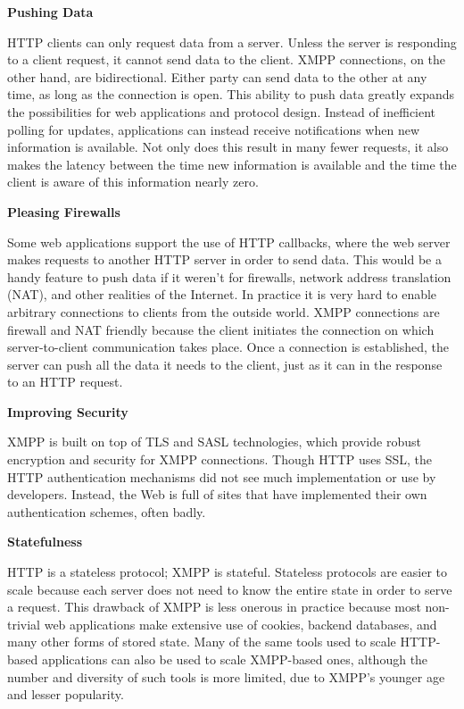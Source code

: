       \textbf{Pushing Data}

      HTTP clients can only request data from a server. Unless the server is responding to a client request,
      it cannot send data to the client. XMPP connections, on the other hand, are bidirectional. Either party
      can send data to the other at any time, as long as the connection is open.
      This ability to push data greatly expands the possibilities for web applications and protocol design.
      Instead of inefficient polling for updates, applications can instead receive notifications when new
      information is available. Not only does this result in many fewer requests, it also makes the latency
      between the time new information is available and the time the client is aware of this information
      nearly zero.

      \textbf{Pleasing Firewalls}

      Some web applications support the use of HTTP callbacks, where the web server makes requests to
      another HTTP server in order to send data. This would be a handy feature to push data if it weren’t
      for firewalls, network address translation (NAT), and other realities of the Internet. In practice it is
      very hard to enable arbitrary connections to clients from the outside world.
      XMPP connections are firewall and NAT friendly because the client initiates the connection on
      which server-to-client communication takes place. Once a connection is established, the server can
      push all the data it needs to the client, just as it can in the response to an HTTP request.

      \textbf{Improving Security}

      XMPP is built on top of TLS and SASL technologies, which provide robust encryption and security
      for XMPP connections. Though HTTP uses SSL, the HTTP authentication mechanisms did not see
      much implementation or use by developers. Instead, the Web is full of sites that have implemented
      their own authentication schemes, often badly.

      \textbf{Statefulness}

      HTTP is a stateless protocol; XMPP is stateful. Stateless protocols are easier to scale because each
      server does not need to know the entire state in order to serve a request. This drawback of XMPP
      is less onerous in practice because most non-trivial web applications make extensive use of cookies,
      backend databases, and many other forms of stored state.
      Many of the same tools used to scale HTTP-based applications can also be used to scale XMPP-based
      ones, although the number and diversity of such tools is more limited, due to XMPP’s younger age and
      lesser popularity.

